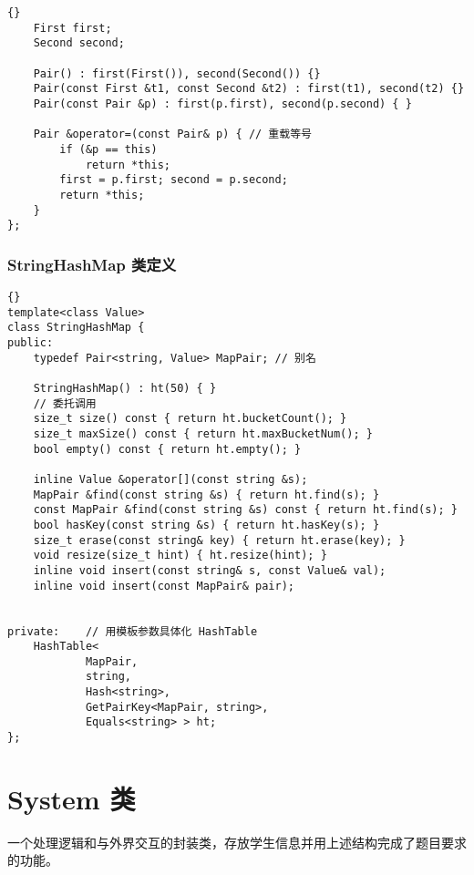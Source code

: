 {\begin{lstlisting}[firstnumber=551, caption=Pair 类定义]{}
    First first;
    Second second;

    Pair() : first(First()), second(Second()) {}
    Pair(const First &t1, const Second &t2) : first(t1), second(t2) {}
    Pair(const Pair &p) : first(p.first), second(p.second) { }

    Pair &operator=(const Pair& p) { // 重载等号
        if (&p == this)
            return *this;
        first = p.first; second = p.second;
        return *this;
    }
};
\end{lstlisting}

\subsection{StringHashMap 类定义}
\begin{lstlisting}[firstnumber=586, caption=StringHashMap 类定义]{}
template<class Value>
class StringHashMap {
public:
    typedef Pair<string, Value> MapPair; // 别名

    StringHashMap() : ht(50) { }
    // 委托调用
    size_t size() const { return ht.bucketCount(); }
    size_t maxSize() const { return ht.maxBucketNum(); }
    bool empty() const { return ht.empty(); }
    
    inline Value &operator[](const string &s);
    MapPair &find(const string &s) { return ht.find(s); }
    const MapPair &find(const string &s) const { return ht.find(s); }
    bool hasKey(const string &s) { return ht.hasKey(s); }
    size_t erase(const string& key) { return ht.erase(key); }
    void resize(size_t hint) { ht.resize(hint); }
    inline void insert(const string& s, const Value& val);
    inline void insert(const MapPair& pair);


private:    // 用模板参数具体化 HashTable
    HashTable<
            MapPair,
            string,
            Hash<string>,
            GetPairKey<MapPair, string>,
            Equals<string> > ht;
};
\end{lstlisting}

}


\chapter{System 类}

一个处理逻辑和与外界交互的封装类，存放学生信息并用上述结构完成了题目要求的功能。

